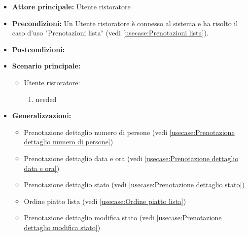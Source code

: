 \label{usecase:Prenotazioni dettaglio}
\begin{itemize}
\item \textbf{Attore principale:} Utente ristoratore
\item \textbf{Precondizioni:}
Un Utente ristoratore è connesso al sistema e ha risolto il caso d'uso "Prenotazioni lista" (vedi \autoref{usecase:Prenotazioni lista}).
\item \textbf{Postcondizioni:}
\item \textbf{Scenario principale:}
\begin{itemize}
\item Utente ristoratore:
\begin{enumerate}
\item needed
\end{enumerate}
\end{itemize}
\item \textbf{Generalizzazioni:}
\begin{itemize}
\item Prenotazione dettaglio numero di persone (vedi \autoref{usecase:Prenotazione dettaglio numero di persone})\item Prenotazione dettaglio data e ora (vedi \autoref{usecase:Prenotazione dettaglio data e ora})\item Prenotazione dettaglio stato (vedi \autoref{usecase:Prenotazione dettaglio stato})\item Ordine piatto lista (vedi \autoref{usecase:Ordine piatto lista})\item Prenotazione dettaglio modifica stato (vedi \autoref{usecase:Prenotazione dettaglio modifica stato})
\end{itemize}
\end{itemize}